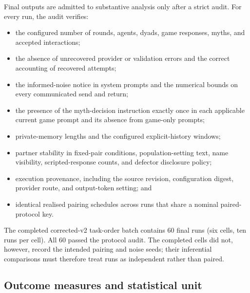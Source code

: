Final outputs are admitted to substantive analysis only after a strict audit.
For every run, the audit verifies:
\begin{itemize}
    \item the configured number of rounds, agents, dyads, game responses, myths,
    and accepted interactions;
    \item the absence of unrecovered provider or validation errors and the
    correct accounting of recovered attempts;
    \item the informed-noise notice in system prompts and the numerical bounds
    on every communicated send and return;
    \item the presence of the myth-decision instruction exactly once in each
    applicable current game prompt and its absence from game-only prompts;
    \item private-memory lengths and the configured explicit-history windows;
    \item partner stability in fixed-pair conditions, population-setting text,
    name visibility, scripted-response counts, and defector disclosure policy;
    \item execution provenance, including the source revision, configuration
    digest, provider route, and output-token setting; and
    \item identical realised pairing schedules across runs that share a nominal
    paired-protocol key.
\end{itemize}
The completed corrected-v2 task-order batch contains 60 final runs (six cells,
ten runs per cell). All 60 passed the protocol audit. The completed cells did
not, however, record the intended pairing and noise seeds; their inferential
comparisons must therefore treat runs as independent rather than paired.

\subsection{Outcome measures and statistical unit}
\label{sec:protocol-outcomes}

